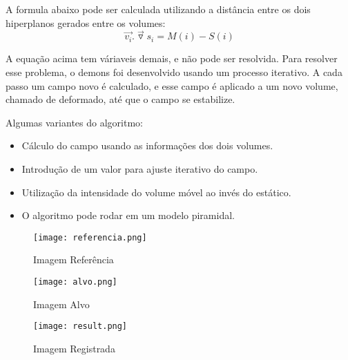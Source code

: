 \documentclass[t]{beamer}
\begin{document}
\begin{frame}
  A formula abaixo pode ser calculada utilizando a distância entre os dois hiperplanos gerados entre os volumes: \\
  \begin{equation*}
    \overrightarrow{v_i} . \overrightarrow{\triangledown}s_i = M(i) - S(i)
  \end{equation*}
\end{frame}

\begin{frame}
  A equação acima tem váriaveis demais, e não pode ser resolvida. Para resolver esse problema, o demons foi desenvolvido usando um processo
  iterativo. A cada passo um campo novo é calculado, e esse campo é aplicado a um novo volume, chamado de deformado, até que o campo se estabilize.
\end{frame}

\begin{frame}
  Algumas variantes do algoritmo:
  \begin{itemize}
    \item Cálculo do campo usando as informações dos dois volumes.
    \item Introdução de um valor para ajuste iterativo do campo.
    \item Utilização da intensidade do volume móvel ao invés do estático. 
    \item O algoritmo pode rodar em um modelo piramidal. 
  \end{itemize}
\end{frame}

\begin{frame}
    \begin{figure}[p]
        \centering
        \texttt{[image: referencia.png]}
        \caption{Imagem Referência}
        \label{fig:refd}
    \end{figure}
\end{frame}

\begin{frame}
    \begin{figure}[p]
        \centering
        \texttt{[image: alvo.png]}
        \caption{Imagem Alvo}
        \label{fig:alvod}
    \end{figure}
\end{frame}

\begin{frame}
    \begin{figure}[p]
        \centering
        \texttt{[image: result.png]}
        \caption{Imagem Registrada}
        \label{fig:resultd}
    \end{figure}
\end{frame}
\end{document}
